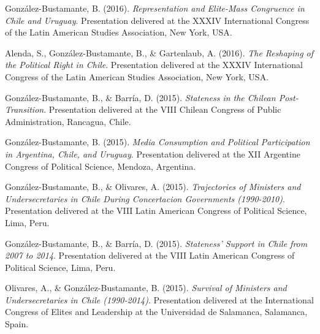 \begin{publications}
\begin{benumerate}{77}
\item{\small González-Bustamante, B. (2016). {\itshape Representation and Elite-Mass Congruence in Chile and Uruguay}. Presentation delivered at the XXXIV International Congress of the Latin American Studies Association, New York, USA.}\vspace{1mm}

\item{\small Alenda, S., González-Bustamante, B., \& Gartenlaub, A. (2016). {\itshape The Reshaping of the Political Right in Chile}. Presentation delivered at the XXXIV International Congress of the Latin American Studies Association, New York, USA.}\vspace{1mm}

\item{\small González-Bustamante, B., \& Barría, D. (2015). {\itshape Stateness in the Chilean Post-Transition}. Presentation delivered at the VIII Chilean Congress of Public Administration, Rancagua, Chile.}\vspace{1mm}

\item{\small González-Bustamante, B. (2015). {\itshape Media Consumption and Political Participation in Argentina, Chile, and Uruguay}. Presentation delivered at the XII Argentine Congress of Political Science, Mendoza, Argentina.}\vspace{1mm}

\item{\small González-Bustamante, B., \& Olivares, A. (2015). {\itshape Trajectories of Ministers and Undersecretaries in Chile During Concertacion Governments (1990-2010)}. Presentation delivered at the VIII Latin American Congress of Political Science, Lima, Peru.}\vspace{1mm}

\item{\small González-Bustamante, B., \& Barría, D. (2015). {\itshape Stateness' Support in Chile from 2007 to 2014}. Presentation delivered at the VIII Latin American Congress of Political Science, Lima, Peru.}\vspace{1mm}

\item{\small Olivares, A., \& González-Bustamante, B. (2015). {\itshape Survival of Ministers and Undersecretaries in Chile (1990-2014)}. Presentation delivered at the International Congress of Elites and Leadership at the Universidad  de Salamanca, Salamanca, Spain.}\vspace{1mm}


\end{benumerate}
\end{publications}
